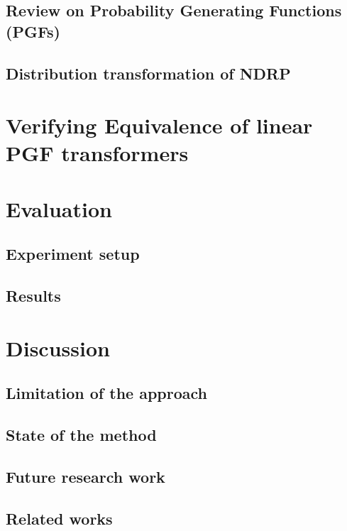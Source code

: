 \documentclass[a4paper]{article}
\begin{document}
\subsection{Review on Probability Generating Functions (PGFs)}

\subsection{Distribution transformation of NDRP}

\section{Verifying Equivalence of linear PGF transformers}

\section{Evaluation}

\subsection{Experiment setup}

\subsection{Results}

\section{Discussion}

\subsection{Limitation of the approach}

\subsection{State of the method}

\subsection{Future research work}

\subsection{Related works}

\appendix
\setlength{\parskip}{0pt}
\printbibliography
\end{document}
